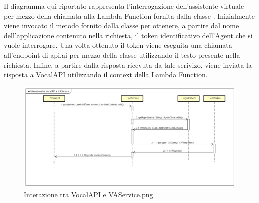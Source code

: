 Il diagramma qui riportato rappresenta l'interrogazione dell'assistente virtuale per mezzo della chiamata alla Lambda Function  fornita dalla classe . Inizialmente viene invocato il metodo  fornito dalla classe  per ottenere, a partire dal nome dell'applicazione contenuto nella richiesta, il token identificativo dell'Agent che si vuole interrogare. Una volta ottenuto il token viene eseguita una chiamata all'endpoint  di api.ai per mezzo della classe  utilizzando il testo presente nella richiesta. Infine, a partire dalla risposta ricevuta da tale serivizo, viene inviata la risposta a VocalAPI utilizzando il context della Lambda Function.
 \begin{figure}[h]
  \centering
  \includegraphics[width=\textwidth,height=\textheight,keepaspectratio]{images/diagrams/back-end/Ufficial_Backend/Interazione tra VocalAPI e VAService.png}
 \caption{Interazione tra VocalAPI e VAService.png}
\end{figure}
\newpage

